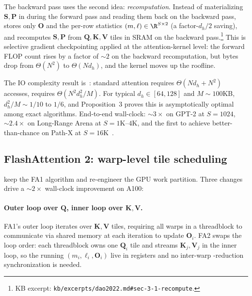 The backward pass uses the second \citet{dao2022} idea:
\emph{recomputation}. Instead of materializing
$\boldsymbol{S}, \boldsymbol{P}$ in  during the forward pass and
reading them back on the backward pass,  stores only
$\boldsymbol{O}$ and the per-row statistics
$(m, \ell) \in \R^{S \times 2}$ (a factor-$d_h/2$ saving), and
recomputes $\boldsymbol{S}, \boldsymbol{P}$ from
$\boldsymbol{Q}, \boldsymbol{K}, \boldsymbol{V}$ tiles in SRAM on the
backward pass.\footnote{KB excerpt:
\nolinkurl{kb/excerpts/dao2022.md#sec-3-1-recompute}.} This is selective
gradient checkpointing applied at the attention-kernel level: the
forward FLOP count rises by a factor of $\sim\!2$ on the backward
recomputation, but  bytes drop from $\Theta(N^2)$ to $\Theta(N
d_h)$, and the kernel moves up the roofline.

The IO complexity result is~\citep[Thm.~2]{dao2022}: standard
attention requires $\Theta(N d_h + N^2)$  accesses, 
requires $\Theta(N^2 d_h^2 / M)$. For typical $d_h \in [64, 128]$ and
$M \sim 100$KB, $d_h^2 / M \sim 1/10$ to $1/6$, and Proposition~3
proves this is asymptotically optimal among exact algorithms. End-to-end
wall-clock: $\sim\!3\times$ on GPT-2 at $S = 1024$, $\sim\!2.4\times$
on Long-Range Arena at $S = 1\text{K}\text{--}4\text{K}$, and the first
 to achieve better-than-chance on Path-X at $S =
16\text{K}$~\citep[\S 1]{dao2022}.

\subsection{FlashAttention 2: warp-level tile scheduling}
\label{sec:fa2}

\citet{dao2023} keep the FA1 algorithm and re-engineer the GPU work
partition. Three changes drive a
$\sim\!2\times$ wall-clock improvement on A100:

\paragraph{Outer loop over $\boldsymbol{Q}$, inner loop over
$\boldsymbol{K}, \boldsymbol{V}$.} FA1's outer loop iterates over
$\boldsymbol{K}, \boldsymbol{V}$ tiles, requiring all warps in a
threadblock to communicate via shared memory at each iteration to
update $\boldsymbol{O}_i$. FA2 swaps the loop order: each threadblock
owns one $\boldsymbol{Q}_i$ tile and streams $\boldsymbol{K}_j,
\boldsymbol{V}_j$ in the inner loop, so the running
$(m_i, \ell_i, \boldsymbol{O}_i)$ live in registers and no inter-warp
-reduction synchronization is needed.

